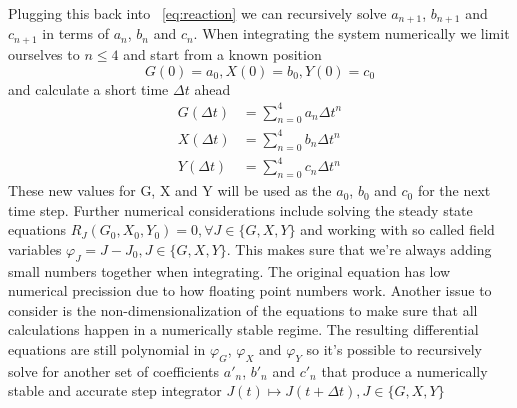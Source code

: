 \documentclass{article}
\begin{document}
Plugging this back into ~\ref{eq:reaction} we can recursively solve $a_{n+1}$, $b_{n+1}$ and $c_{n+1}$ in terms of $a_{n}$, $b_{n}$ and $c_{n}$. When integrating the system numerically we limit ourselves to $n\leq4$ and start from a known position
\begin{equation}
G(0) = a_0, X(0) = b_0, Y(0) = c_0
\end{equation}
and calculate a short time $\Delta t$ ahead
\begin{align*}
G(\Delta t) &= \sum_{n=0}^{4}a_n \Delta t^n \\
X(\Delta t) &= \sum_{n=0}^{4}b_n \Delta t^n \\
Y(\Delta t) &= \sum_{n=0}^{4}c_n \Delta t^n
\end{align*}
These new values for G, X and Y will be used as the $a_0$, $b_0$ and $c_0$ for the next time step.
Further numerical considerations include solving the steady state equations $R_J(G_0, X_0, Y_0)=0, \forall J \in \{G, X, Y\}$ and working with so called field variables $\varphi_J = J - J_0, J \in \{G, X, Y\}$. This makes sure that we're always adding small numbers together when integrating. The original equation has low numerical precission due to how floating point numbers work. Another issue to consider is the non-dimensionalization of the equations to make sure that all calculations happen in a numerically stable regime. The resulting differential equations are still polynomial in $\varphi_G$, $\varphi_X$ and $\varphi_Y$ so it's possible to recursively solve for another set of coefficients $a'_{n}$, $b'_{n}$ and $c'_{n}$ that produce a numerically stable and accurate step integrator $J(t) \mapsto J(t+\Delta t), J \in \{G, X, Y\}$
\end{document}
